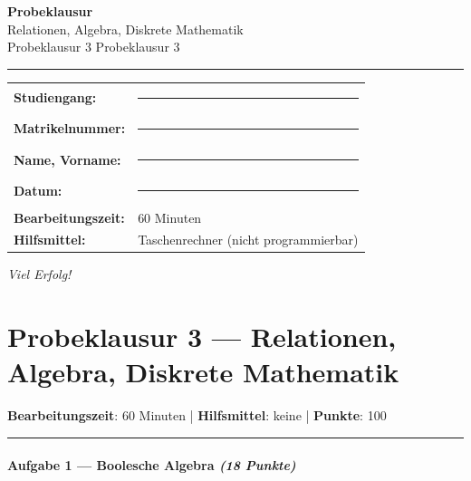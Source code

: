 \documentclass[11pt, a4paper]{article}
\providecommand{\nichttitle}{Probeklausur}
\providecommand{\nichtsubtitle}{}
\renewcommand{\nichttitle}{Relationen, Algebra, Diskrete Mathematik}
\renewcommand{\nichtsubtitle}{Probeklausur 3}
\begin{document}
\thispagestyle{empty}
\begin{center}
\vspace*{1cm}
{\Huge\bfseries\color{accent}Probeklausur}\\[8pt]
{\Large\color{accent}\nichttitle}\\[4pt]
\ifx\nichtsubtitle\empty\else
  {\large\color{accent!80!black}\nichtsubtitle}\\[6pt]
\fi
\color{accent}\rule{0.5\linewidth}{1pt}\color{black}
\end{center}

\vspace{1cm}
\begin{tabularx}{\textwidth}{@{}l X@{}}
\textbf{Studiengang:}      & \rule{6cm}{0.4pt} \\[6pt]
\textbf{Matrikelnummer:}    & \rule{6cm}{0.4pt} \\[6pt]
\textbf{Name, Vorname:}    & \rule{6cm}{0.4pt} \\[6pt]
\textbf{Datum:}             & \rule{6cm}{0.4pt} \\[6pt]
\textbf{Bearbeitungszeit:}  & 60 Minuten \\[6pt]
\textbf{Hilfsmittel:}       & Taschenrechner (nicht programmierbar) \\
\end{tabularx}

\vspace{2cm}
\begin{center}
{\large\itshape Viel Erfolg!}
\end{center}

\newpage


\section{Probeklausur 3 — Relationen, Algebra, Diskrete Mathematik}

\textbf{Bearbeitungszeit}: 60 Minuten | \textbf{Hilfsmittel}: keine | \textbf{Punkte}: 100



\noindent\textcolor{rulegray}{\rule{\linewidth}{0.4pt}}


\paragraph{Aufgabe 1 — Boolesche Algebra \textit{(18 Punkte)}}\mbox{}\\[2pt]
\end{document}
